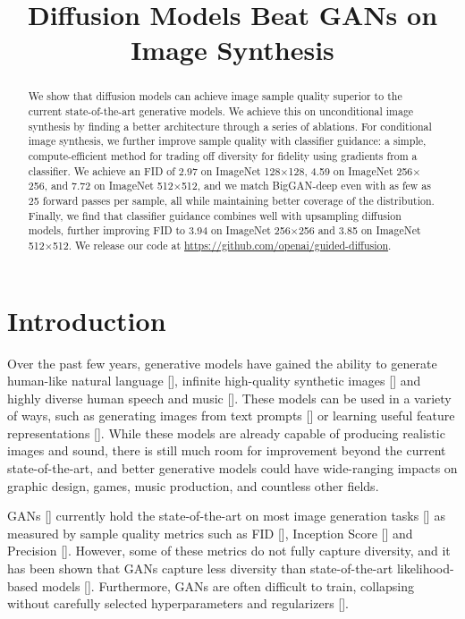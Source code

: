 \title{Diffusion Models Beat GANs on Image Synthesis}

\begin{abstract}
We show that diffusion models can achieve image sample quality superior to the current state-of-the-art generative models. We achieve this on unconditional image synthesis by finding a better architecture through a series of ablations. For conditional image synthesis, we further improve sample quality with classifier guidance: a simple, compute-efficient method for trading off diversity for fidelity using gradients from a classifier. We achieve an FID of 2.97 on ImageNet 128$\times$128, 4.59 on ImageNet 256$\times$256, and 7.72 on ImageNet 512$\times$512, and we match BigGAN-deep even with as few as 25 forward passes per sample, all while maintaining better coverage of the distribution. Finally, we find that classifier guidance combines well with upsampling diffusion models, further improving FID to 3.94 on ImageNet 256$\times$256 and 3.85 on ImageNet 512$\times$512. We release our code at \url{https://github.com/openai/guided-diffusion}.
\end{abstract}

\section{Introduction}

Over the past few years, generative models have gained the ability to generate human-like natural language [], infinite high-quality synthetic images [] and highly diverse human speech and music []. These models can be used in a variety of ways, such as generating images from text prompts [] or learning useful feature representations []. While these models are already capable of producing realistic images and sound, there is still much room for improvement beyond the current state-of-the-art, and better generative models could have wide-ranging impacts on graphic design, games, music production, and countless other fields. 

GANs [] currently hold the state-of-the-art on most image generation tasks [] as measured by sample quality metrics such as FID [], Inception Score [] and Precision []. However, some of these metrics do not fully capture diversity, and it has been shown that GANs capture less diversity than state-of-the-art likelihood-based models []. Furthermore, GANs are often difficult to train, collapsing without carefully selected hyperparameters and regularizers [].

